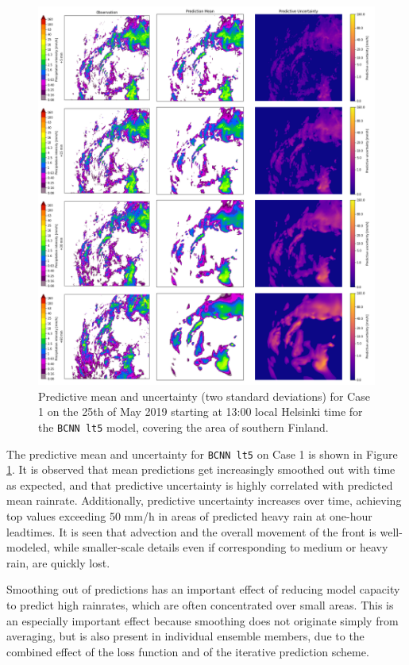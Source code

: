 \begin{figure}[H]
	\centering
	\includegraphics[width=\textwidth]{images/cases/bcnn_mean_case1}
	\caption{Predictive mean and uncertainty (two standard deviations) for Case 1 on the 25th of May 2019 starting at 13:00 local Helsinki time for the \texttt{BCNN lt5} model, covering the area of southern Finland.}
	\label{fig:bcnn_mean_case1}
\end{figure}

The predictive mean and uncertainty for \texttt{BCNN lt5} on Case 1 is shown in Figure \ref{fig:bcnn_mean_case1}. It is observed that mean predictions get increasingly smoothed out with time as expected, and that predictive uncertainty is highly correlated with predicted mean rainrate. 
%
%
Additionally, predictive uncertainty increases over time, achieving top values exceeding 50 mm/h in areas of predicted heavy rain at one-hour leadtimes. It is seen that advection and the overall movement of the front is well-modeled, while smaller-scale details even if corresponding to medium or heavy rain, are quickly lost. 



Smoothing out of predictions has an important effect of reducing model capacity to predict high rainrates, which are often concentrated over small areas. This is an especially important effect because smoothing does not originate simply from averaging, but is also present in individual ensemble members, due to the combined effect of the loss function and of the iterative prediction scheme. 

